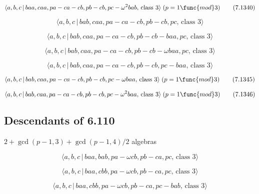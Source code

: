 \documentclass[10pt]{article}
\begin{document}
\begin{equation}
\langle a,b,c\,|\,baa,caa,pa-ca-cb,pb-cb,pc-\omega ^{2}bab,\,\text{class }%
3\rangle \;(p=1\func{mod}3)  \tag{7.1340}
\end{equation}

\begin{equation}
\langle a,b,c\,|\,bab,caa,pa-ca-cb,pb-cb,pc,\,\text{class }3\rangle 
\tag{7.1341}
\end{equation}

\begin{equation}
\langle a,b,c\,|\,bab,caa,pa-ca-cb,pb-cb-baa,pc,\,\text{class }3\rangle 
\tag{7.1342}
\end{equation}

\begin{equation}
\langle a,b,c\,|\,bab,caa,pa-ca-cb,pb-cb-\omega baa,pc,\,\text{class }%
3\rangle  \tag{7.1343}
\end{equation}

\begin{equation}
\langle a,b,c\,|\,bab,caa,pa-ca-cb,pb-cb,pc-baa,\,\text{class }3\rangle 
\tag{7.1344}
\end{equation}

\begin{equation}
\langle a,b,c\,|\,bab,caa,pa-ca-cb,pb-cb,pc-\omega baa,\,\text{class }%
3\rangle \;(p=1\func{mod}3)  \tag{7.1345}
\end{equation}

\begin{equation}
\langle a,b,c\,|\,bab,caa,pa-ca-cb,pb-cb,pc-\omega ^{2}baa,\,\text{class }%
3\rangle \;(p=1\func{mod}3)  \tag{7.1346}
\end{equation}

\subsection{Descendants of 6.110}

$2+\gcd (p-1,3)+\gcd (p-1,4)/2$ algebras

\begin{equation}
\langle a,b,c\,|\,baa,bab,pa-\omega cb,pb-ca,pc,\,\text{class }3\rangle 
\tag{7.1347}
\end{equation}

\begin{equation}
\langle a,b,c\,|\,baa,cbb,pa-\omega cb,pb-ca,pc,\,\text{class }3\rangle 
\tag{7.1348}
\end{equation}

\begin{equation}
\langle a,b,c\,|\,baa,cbb,pa-\omega cb,pb-ca,pc-bab,\,\text{class }3\rangle 
\tag{7.1349}
\end{equation}
\end{document}
